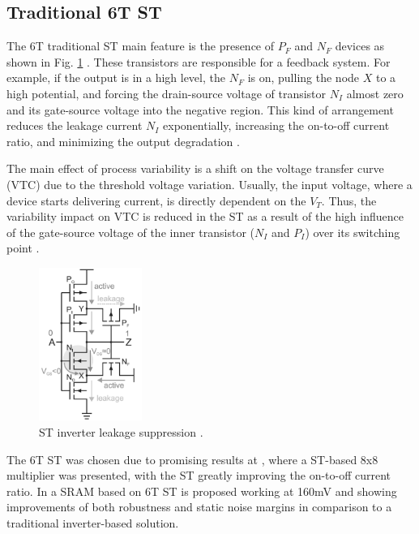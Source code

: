 \documentclass[pgmicro,mestrado,english]{iiufrgs}
\begin{document}
\subsection{Traditional 6T ST}
The 6T traditional ST main feature is the presence of ${P_F}$ and ${N_F}$ devices as shown in Fig. \ref{fig:ST} \cite{doki1984cmos}. These transistors are responsible for a feedback system. For example, if the output is in a high level, the ${N_F}$ is on, pulling the node ${X}$ to a high potential, and forcing the drain-source voltage of transistor ${N_I}$ almost zero and its gate-source voltage into the negative region. This kind of arrangement reduces the leakage current ${N_I}$ exponentially, increasing the on-to-off current ratio, and minimizing the output degradation \cite{lotze2017ultra}.

The main effect of process variability is a shift on the voltage transfer curve (VTC) due to the threshold voltage variation. Usually, the input voltage, where a device starts delivering current, is directly dependent on the $V_T$. Thus, the variability impact on VTC is reduced in the ST as a result of the high influence of the gate-source voltage of the inner transistor ($N_I$ and $P_I$) over its switching point \cite{lotze2017ultra}.

\begin{figure}[]
  \centering
    \includegraphics[width=0.3\textwidth]{ST.pdf}
     \caption{ST inverter leakage suppression \cite{lotze2017ultra}.}
  \label{fig:ST}
\end{figure}

The 6T ST was chosen due to promising results at \cite{lotze2017ultra}, where a ST-based 8x8 multiplier was presented, with the ST greatly improving the on-to-off current ratio. In \cite{kulkarni2007160} a SRAM based on 6T ST is proposed working at 160mV and showing improvements of both robustness and static noise margins in comparison to a traditional inverter-based solution. 
\end{document}

